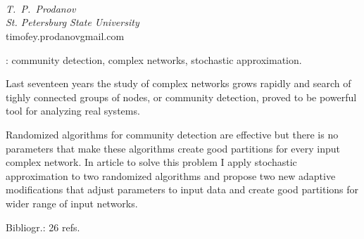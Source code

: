 \section[\hspace{-0.42cm}Abstracts
 \dotfill{}]{}
\vspace{-.56cm}


\section[\hspace{-0.42cm}Prodanov~T.~P.~(SPb) Adaptive Randomized Algorithms for Community Detection in Graphs\dotfill{}]{}
\vspace{-.56cm}
\\   {\it T.~P.~Prodanov}
\\  {\it St. Petersburg State University}
\\ timofey.prodanovgmail.com


\noindent \hrulefill{}

\vspace{0.2cm}

: community detection, complex networks, stochastic approxi\-mation.

\vspace{0.1cm}

Last seventeen years the study of complex networks grows rapidly and search of tighly connected groups of nodes, or community detection, proved to be powerful tool for analyzing real systems.

Randomized algorithms for community detection are effective but there is no parameters that make these algorithms create good partitions for every input complex network. In article to solve this problem I apply stochastic approximation to two randomized algorithms and propose two new adaptive modifications that adjust parameters to input data and create good partitions for wider range of input networks.

Bibliogr.: 26 refs.

